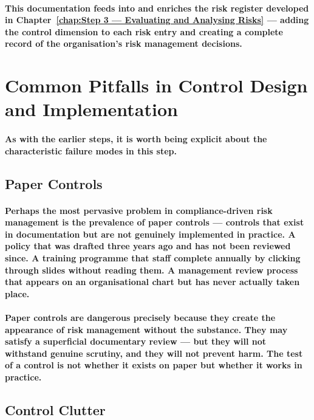\paragraph{This documentation feeds into and enriches the risk register developed in Chapter~\ref{chap:Step 3 — Evaluating and Analysing Risks} — adding the control dimension to each risk entry and creating a complete record of the organisation's risk management decisions.}

\section{Common Pitfalls in Control Design and Implementation}
\paragraph{As with the earlier steps, it is worth being explicit about the characteristic failure modes in this step.}

\subsection{Paper Controls}
\paragraph{Perhaps the most pervasive problem in compliance-driven risk management is the prevalence of \textbf{paper controls} — controls that exist in documentation but are not genuinely implemented in practice. A policy that was drafted three years ago and has not been reviewed since. A training programme that staff complete annually by clicking through slides without reading them. A management review process that appears on an organisational chart but has never actually taken place.}
\paragraph{Paper controls are dangerous precisely because they create the appearance of risk management without the substance. They may satisfy a superficial documentary review — but they will not withstand genuine scrutiny, and they will not prevent harm. The test of a control is not whether it exists on paper but whether it works in practice.}

\subsection{Control Clutter}
